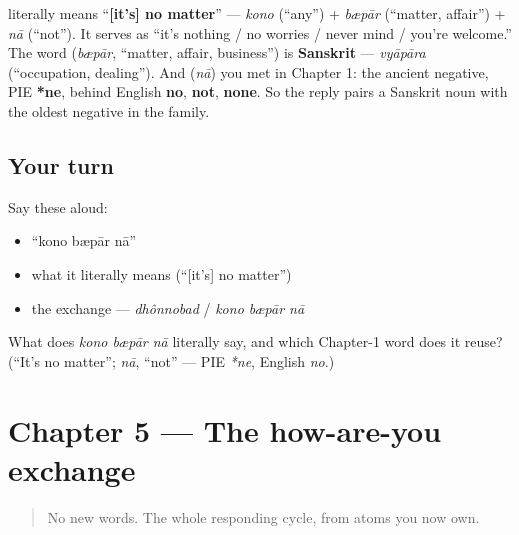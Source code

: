 \begin{cousinweb}
\textbf{  } literally means \textquotedblleft{}\textbf{{[}it's{]} no matter}\textquotedblright{} — \emph{kono} (\textquotedblleft{}any\textquotedblright{}) + \emph{bæpār} (\textquotedblleft{}matter, affair\textquotedblright{}) + \emph{nā} (\textquotedblleft{}not\textquotedblright{}). It serves as \textquotedblleft{}it's nothing / no worries / never mind / you're welcome.\textquotedblright{} The word \textbf{} (\emph{bæpār}, \textquotedblleft{}matter, affair, business\textquotedblright{}) is \textbf{Sanskrit} — \emph{vyāpāra} (\textquotedblleft{}occupation, dealing\textquotedblright{}). And \textbf{} (\emph{nā}) you met in Chapter 1: the ancient negative, PIE \textbf{*ne}, behind English \textbf{no}, \textbf{not}, \textbf{none}. So the reply pairs a Sanskrit noun with the oldest negative in the family.
\end{cousinweb}

\subsection*{Your turn}
Say these aloud:

\begin{itemize}
\raggedright
  \item \textquotedblleft{}kono bæpār nā\textquotedblright{}
  \item what it literally means (\textquotedblleft{}{[}it's{]} no matter\textquotedblright{})
  \item the exchange — \emph{dhônnobad} / \emph{kono bæpār nā}
\end{itemize}

\begin{tcolorbox}[breakable,colback=teal!4,colframe=teal!35!black,title={Before you move on}]
What does \emph{kono bæpār nā} literally say, and which Chapter-1 word does it reuse? (\textquotedblleft{}It's no matter\textquotedblright{}; \emph{nā}, \textquotedblleft{}not\textquotedblright{} — PIE \emph{*ne}, English \emph{no}.)
\end{tcolorbox}
\section[Practice]{Chapter 5 — The how-are-you exchange}

\label{lesson:BN-C03-practice}



\begin{quote}
No new words. The whole responding cycle, from atoms you now own.
\end{quote}

